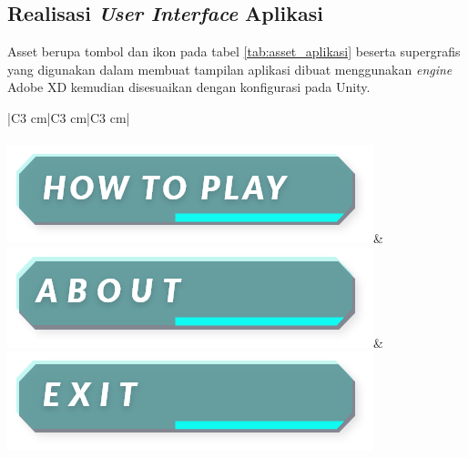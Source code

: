 	\subsection{Realisasi \textit{User Interface} Aplikasi}
	\vspace{1ex}
		Asset berupa tombol dan ikon pada tabel \ref{tab:asset_aplikasi} beserta supergrafis yang digunakan dalam membuat tampilan aplikasi dibuat menggunakan \textit{engine} Adobe XD kemudian disesuaikan dengan konfigurasi pada Unity.
		\vspace{-2ex}
		\begin{table}[h]
		\caption{Asset tombol dan ikon pada tampilan aplikasi.}
		\label{tab:asset_aplikasi}
			\begin{tabular}{|C{3 cm}|C{3 cm}|C{3 cm}|}
				\hline 
				 \\
				 \\ \hline
				\includegraphics[width=\linewidth]{img/bab3/button/htp_sblm.png}&
				\includegraphics[width=\linewidth]{img/bab3/button/about_sblm.png}&
				\includegraphics[width=\linewidth]{img/bab3/button/exit_sblm.png} \\ 

\end{tabular}
\end{table}
